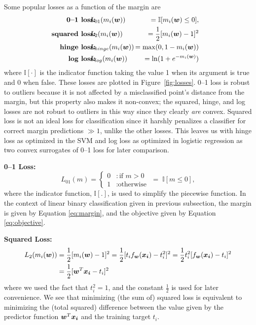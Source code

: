 Some popular losses as a function of the margin are
{\footnotesize
\begin{eqnarray}
\!\!\!\!\!\mbox{\bf 0--1 loss:} & \!\!\!\!\! L_{01}(m_i(\w))\!\!\!\!\! & = \mathbb{I} [m_i(\w) \leq 0], \label{eq:loss01} \\
\!\!\!\!\!\mbox{\bf squared loss:} & \!\!\!\!\! L_2(m_i(\w))\!\!\!\!\! &= \frac{1}{2}[m_i(\w) - 1]^2 \\
\!\!\!\!\!\mbox{\bf hinge loss:} & \!\!\!\!\! L_{hinge}(m_i(\w))\!\!\!\!\! &= \max(0, 1 - m_i(\w)) \\
\!\!\!\!\!\mbox{\bf log loss:} & \!\!\!\!\! L_{log}(m_i(\w))\!\!\!\!\! &= \ln (1 + e^{-m_i(\w)}) 
\end{eqnarray}}
where $\mathbb{I}[\cdot]$ is the indicator function taking the value 1
when its argument is true and 0 when false.  These losses are plotted
in Figure~\ref{fig:losses}.  0--1 loss is robust to outliers because
it is not affected by a misclassified point's distance from the
margin, but this property also makes it non-convex; the squared,
hinge, and log losses are not robust to outliers in this way since
they clearly \emph{are} convex.  Squared loss is not an ideal loss for
classification since it harshly penalizes a classifier for correct
margin predictions $\gg 1$, unlike the other losses.  This leaves us
with hinge loss as optimized in the SVM and log loss as optimized in
logistic regression as two convex surrogates of 
0--1 loss for later comparison.


\COMMENT

{\bf 0--1 Loss:} 
\begin{equation}
L_{01}(m) = \left\{
     \begin{array}{ll}
       0 & : \text{if }m > 0\\
       1 & : \text{otherwise}
     \end{array}
   \right.
   \; = \; \mathbb{I} [m \leq 0], \label{eq:loss01}
\end{equation}
where the indicator function, $\mathbb{I} [.]$, is used to simplify
the piecewise function. In the context of linear binary classification
given in previous subsection, the margin is given by Equation
\ref{eq:margin}, and the objective given by Equation
\ref{eq:objective}.

{\bf Squared Loss:}
\begin{align}
L_2(m_i(\boldsymbol{w})) &= \frac{1}{2}[m_i(\boldsymbol{w}) - 1]^2 = \frac{1}{2}[t_i f_{\boldsymbol{w}}(\boldsymbol{x_i}) - t_i^2]^2 = \frac{1}{2}t_i^2 [f_{\boldsymbol{w}}(\boldsymbol{x_i}) - t_i]^2 \nonumber \\
& = \frac{1}{2}[\boldsymbol{w}^T\boldsymbol{x_i} - t_i]^2 \label{eq:loss2}
\end{align}
where we used the fact that $t_i^2 = 1$, and the constant
$\frac{1}{2}$ is used for later convenience. We see that minimizing
(the sum of) squared loss is equivalent to minimizing the (total
squared) difference between the value given by the predictor function
$\boldsymbol{w}^T\boldsymbol{x_i}$ and the training target $t_i$.

